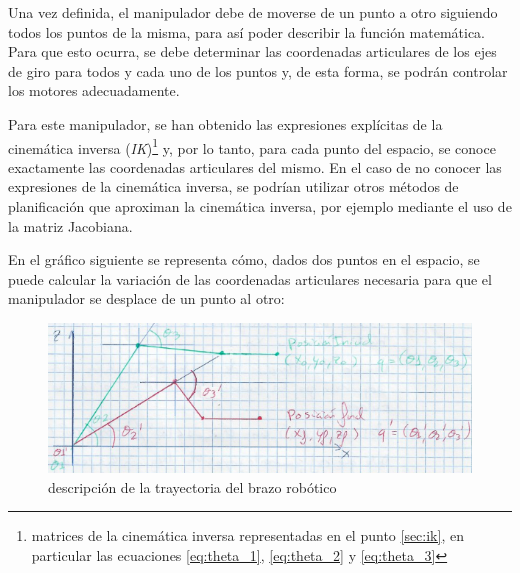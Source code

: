 \documentclass[a4paper,12pt]{article}
\begin{document}
Una vez definida, el manipulador debe de moverse de un punto a otro siguiendo todos los puntos de la misma,
para así poder describir la función matemática. Para que esto ocurra, se debe determinar las coordenadas
articulares de los ejes de giro para todos y cada uno de los puntos y, de esta forma, se podrán controlar
los motores adecuadamente.

Para este manipulador, se han obtenido las expresiones explícitas de la cinemática inversa
(\textit{IK})\footnote{matrices de la cinemática inversa representadas en el punto 
\ref{sec:ik}, en particular las ecuaciones \ref{eq:theta_1}, \ref{eq:theta_2} y \ref{eq:theta_3}} y,
por lo tanto, para cada punto del espacio, se conoce exactamente las coordenadas articulares del mismo.
En el caso de no conocer las expresiones de la cinemática inversa, se podrían utilizar otros métodos de planificación
que aproximan la cinemática inversa, por ejemplo mediante el uso de la matriz Jacobiana.

En el gráfico siguiente se representa cómo, dados dos puntos en el espacio, se puede calcular
la variación de las coordenadas articulares necesaria para que el manipulador se desplace de un punto al otro:

\begin{figure}[H]
    \centering
    \includegraphics[width=.6\linewidth]{images/Trayectoria.png}
    \caption{descripción de la trayectoria del brazo robótico}
    \label{fig:trajectory}
\end{figure}
\end{document}
